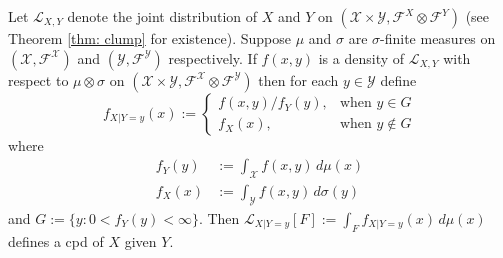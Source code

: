 \begin{theorem}
Let $\mathcal L_{X,Y}$ denote the joint distribution of $X$ and $Y$ on $(\mathcal X\times \mathcal Y, \mathcal F^X\otimes \mathcal F^Y)$ (see Theorem \ref{thm: clump} for existence). Suppose  $\mu$ and $\sigma$ are $\sigma$-finite measures on $(\mathcal X, \mathcal F^{\mathcal X})$  and $(\mathcal Y, \mathcal F^{\mathcal Y})$ respectively. If $f(x,y) $  is a density of $\mathcal L_{X,Y}$ with respect to $\mu \otimes \sigma$ on $(\mathcal X\times \mathcal Y, \mathcal F^{\mathcal X}\otimes\mathcal F^{\mathcal Y})$ then for each $y\in\mathcal Y$ define
\[
f_{X|Y = y}(x) :=
\begin{cases}
 f(x,y) / f_Y(y), & \text{when $y \in G$}\\
 f_X(x), & \text{when $y \not\in G$}
\end{cases}
\]
where
\begin{align*}
f_Y(y)&:= \int_{\mathcal X} f(x,y) \,d\mu(x) \\
f_X(x)&:= \int_{\mathcal Y} f(x,y)\,d\sigma(y)
\end{align*}
 and $G:=\{y\colon 0< f_Y(y) <\infty \}$. Then
$\mathcal L_{X|Y=y}[F] := \int_F f_{X|Y = y}(x)\,d\mu(x)$ defines a cpd of $X$ given $Y$.
\end{theorem}
